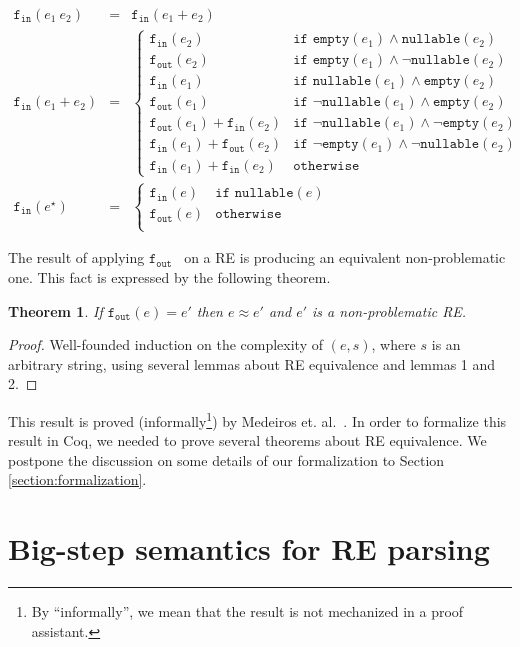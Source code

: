 \documentclass[oneside,12pt]{scrbook}
\newtheorem{Theorem}{Theorem}
\theoremstyle{definition}
\newcommand{\nullable}{\ensuremath{\texttt{nullable}}}
\newcommand{\emptyy}{\ensuremath{\texttt{empty}}}
\newcommand{\fin}{\ensuremath{\texttt{f$_{\texttt{in}}$}}}
\newcommand{\fout}{\ensuremath{\texttt{f$_{\texttt{out}}$}}}
\theoremstyle{plain}
\theoremstyle{definition}
\begin{document}
\[
\begin{array}{lcl}
\fin(e_1\:e_2) & = & \fin(e_1+e_2)\\
\fin(e_1 + e_2) & = & \left\{
\begin{array}{ll}
\fin(e_2)  & \texttt{if }\emptyy(e_1) \land \nullable(e_2)\\
\fout(e_2) & \texttt{if }\emptyy(e_1) \land \neg \nullable(e_2)\\
\fin(e_1)  & \texttt{if }\nullable(e_1) \land \emptyy(e_2)\\
\fout(e_1) & \texttt{if }\neg \nullable(e_1) \land \emptyy(e_2)\\
\fout(e_1) + \fin(e_2) & \texttt{if }\neg \nullable(e_1) \land \neg\emptyy(e_2)\\
\fin(e_1) + \fout(e_2) & \texttt{if }\neg \emptyy(e_1) \land \neg \nullable(e_2)\\
\fin(e_1) + \fin(e_2) & \texttt{otherwise}
\end{array}
\right. \\
\fin(e^\star) & = & \left\{
\begin{array}{ll}
\fin(e) & \texttt{if }\nullable(e)\\
\fout(e) & \texttt{otherwise}\\
\end{array}
\right.
\end{array}
\]

The result of applying \fout~ on a RE is producing an equivalent non-problematic one. This fact is expressed
by the following theorem. 

\begin{Theorem}
	If $\fout(e) = e'$ then $e \approx e'$ and $e'$ is a non-problematic RE.
\end{Theorem}
\begin{proof}
	Well-founded induction on the complexity of $(e,s)$, where $s$ is an arbitrary string, using
	several lemmas about RE equivalence and lemmas 1 and 2.
\end{proof}

This result is proved (informally\footnote{By ``informally'', we mean that the
	result is not mechanized in a proof assistant.}) by Medeiros et. al.~\cite{Medeiros14}. In order to formalize this result
in Coq, we needed to prove several theorems about RE equivalence. We postpone the discussion on some details
of our formalization to Section \ref{section:formalization}.

\section{Big-step semantics for RE parsing}\label{section:semantics}
\end{document}
